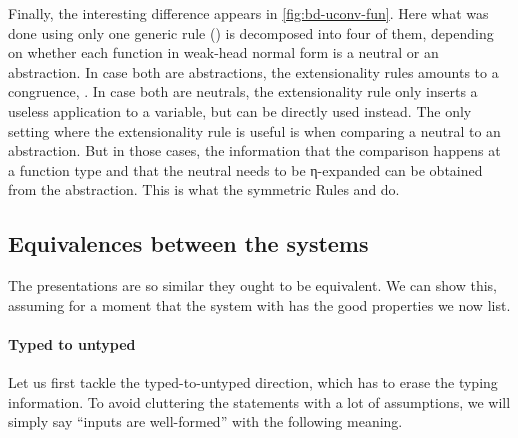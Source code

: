 Finally, the interesting difference appears in \cref{fig:bd-uconv-fun}. Here what was done
using only one generic rule () is decomposed into four of them,
depending on whether each function in weak-head normal form is a neutral or an abstraction.
In case both are abstractions, the extensionality rules amounts to a congruence, \ie
{}.%
In case both are neutrals, the extensionality rule only inserts
a useless application to a variable, but  can be directly used
instead. The only setting where the extensionality rule is useful is when comparing a neutral
to an abstraction. But in those cases, the information that the comparison happens at a function
type and that the neutral needs to be η-expanded can be obtained from the abstraction.
This is what the symmetric Rules  and  do.

\subsection{Equivalences between the systems}

The presentations are so similar they ought to be equivalent. We can show this, assuming
for a moment that the system with  has the good properties we now list.


\paragraph{Typed to untyped}

Let us first tackle the typed-to-untyped direction, which has to erase the typing information.
To avoid cluttering the statements with a lot of assumptions, we will simply say “inputs are
well-formed” with the following meaning.

